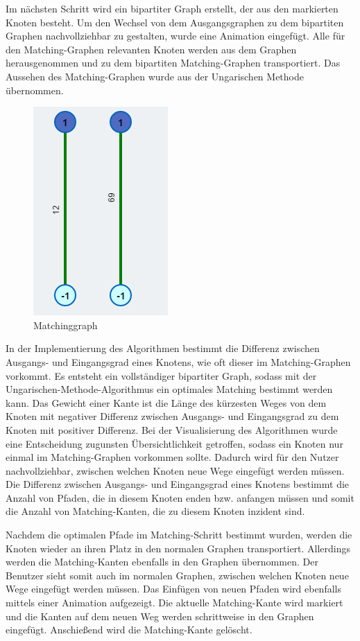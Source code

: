 Im nächsten Schritt wird ein bipartiter Graph erstellt, der aus den markierten Knoten besteht. Um den Wechsel von dem Ausgangsgraphen zu dem bipartiten Graphen nachvollziehbar zu gestalten, wurde eine Animation eingefügt. Alle für den Matching-Graphen relevanten Knoten werden aus dem Graphen herausgenommen und zu dem bipartiten Matching-Graphen transportiert. Das Aussehen des Matching-Graphen wurde aus der Ungarischen Methode übernommen. 

\begin{figure}[h!]
	\centering
	\includegraphics[]{figures/postman_matching}
	\caption[Matching]{Matchinggraph }\label{fig:postman_matching}
\end{figure}

In der Implementierung des Algorithmen bestimmt die Differenz zwischen Ausgangs- und Eingangsgrad eines Knotens, wie oft dieser im Matching-Graphen vorkommt. Es entsteht ein vollständiger bipartiter Graph, sodass mit der Ungarischen-Methode-Algorithmus ein optimales Matching bestimmt werden kann. Das Gewicht einer Kante ist die Länge des kürzesten Weges von dem Knoten mit negativer Differenz zwischen Ausgangs- und Eingangsgrad zu dem Knoten mit positiver Differenz. Bei der Visualisierung des Algorithmen wurde eine Entscheidung zugunsten Übersichtlichkeit getroffen, sodass ein Knoten nur einmal im Matching-Graphen vorkommen sollte. Dadurch wird für den Nutzer nachvollziehbar, zwischen welchen Knoten neue Wege eingefügt werden müssen. Die Differenz zwischen Ausgangs- und Eingangsgrad eines Knotens bestimmt die Anzahl von Pfaden, die in diesem Knoten enden bzw. anfangen müssen und somit die Anzahl von Matching-Kanten, die zu diesem Knoten inzident sind.

Nachdem die optimalen Pfade im Matching-Schritt bestimmt wurden, werden die Knoten wieder an ihren Platz in den normalen Graphen transportiert. Allerdings werden die Matching-Kanten ebenfalls in den Graphen übernommen. Der Benutzer sieht somit auch im normalen Graphen, zwischen welchen Knoten neue Wege eingefügt werden müssen.
Das Einfügen von neuen Pfaden wird ebenfalls mittels einer Animation aufgezeigt. Die aktuelle Matching-Kante wird markiert und die Kanten auf dem neuen Weg werden schrittweise in den Graphen eingefügt. Anschießend wird die Matching-Kante gelöscht.

